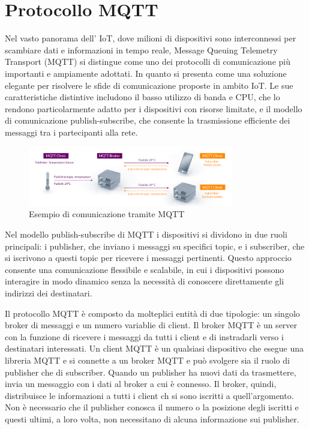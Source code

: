 \documentclass[12pt,a4paper,openright,twoside]{book}
\begin{document}
\section{Protocollo MQTT}

Nel vasto panorama dell' \ac{IoT}, dove milioni di dispositivi sono interconnessi per scambiare dati e informazioni in tempo reale, Message Queuing Telemetry Transport (MQTT) 
si distingue come uno dei protocolli di comunicazione più importanti e ampiamente adottati. In quanto si presenta come una soluzione elegante per risolvere le sfide di 
comunicazione proposte in ambito \ac*{IoT}. Le sue caratteristiche distintive includono il basso utilizzo di banda e CPU, che lo rendono particolarmente adatto per i 
dispositivi con risorse limitate, e il modello di comunicazione publish-subscribe, che consente la trasmissione efficiente dei messaggi tra i partecipanti alla rete.

\begin{figure}[h]
    \centering
    \includegraphics[width=0.8\textwidth]{figures/mqtt-example.png}
    \caption{Esempio di comunicazione tramite MQTT}
    \label{fig:mqtt-example}
\end{figure}

Nel modello publish-subscribe di \ac{MQTT} i dispositivi si dividono in due ruoli principali:
 i publisher, che inviano i messaggi su specifici topic, e i subscriber, che si iscrivono a questi topic per ricevere i messaggi pertinenti. 
 Questo approccio consente una comunicazione flessibile e scalabile, in cui i dispositivi possono interagire in modo dinamico senza la necessità
 di conoscere direttamente gli indirizzi dei destinatari.

Il protocollo \ac{MQTT} è composto da molteplici entità di due tipologie: un singolo broker di messaggi e un numero variablie di client. Il broker \ac{MQTT} è un server 
con la funzione di ricevere i messaggi da tutti i client e di instradarli verso i destinatari interessati. Un client MQTT è un qualsiasi dispositivo che esegue una libreria 
\ac{MQTT} e si connette a un broker \ac{MQTT} e può svolgere sia il ruolo di publisher che di subscriber. Quando un publisher ha nuovi dati da trasmettere, 
invia un messaggio con i dati al broker a cui è connesso. Il broker, quindi, distribuisce le informazioni a tutti i client ch si sono iscritti a quell’argomento. 
Non è necessario che il publisher conosca il numero o la posizione degli iscritti e questi ultimi, a loro volta, non necessitano di alcuna informazione sui publisher.
\end{document}
